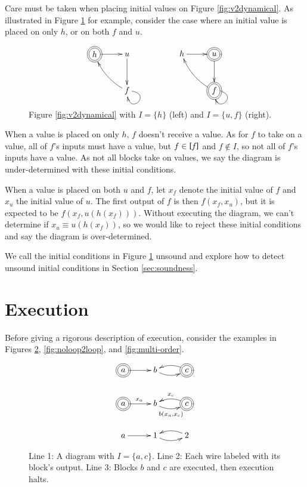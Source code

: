 \documentclass[twocolumn]{article}
\newcommand{\TightBracketB}[1]{\raisebox{0.25ex}{\scalebox{0.8}{\boldmath${#1\kern-0.65ex#1}$}}}%
\newcommand*{\Inputs}[1]{\TightBracketB[#1\TightBracketB]}
\begin{document}
Care must be taken when placing initial values on Figure \ref{fig:v2dynamical}. As illustrated in Figure \ref{fig:meow} for example, consider the case where an initial value is placed on only $h$, or on both $f$ and $u$.

\begin{figure}[h]
\[
    \xymatrix {
        *++[o][F=]{h} \ar[r] & u \ar[d] && h \ar[r] & *++[o][F=]{u} \ar[d] \\
        & f \ar@/^/[lu] \ar@(r, d)[] && & *++[o][F=]{f} \ar@/^/[lu] \ar@(r, d)[]
    }
\]
    \caption{Figure \ref{fig:v2dynamical} with $I=\{h\}$ (left) and $I=\{u, f\}$ (right).}
    \label{fig:meow}
\end{figure}

When a value is placed on only $h$, $f$ doesn't receive a value. As for $f$ to take on a value, all of $f$'s inputs must have a value, but $f\in\Inputs{f}$ and $f\not\in I$, so not all of $f$'s inputs have a value. As not all blocks take on values, we say the diagram is under-determined with these initial conditions.

When a value is placed on both $u$ and $f$, let $x_f$ denote the initial value of $f$ and $x_u$ the initial value of $u$. The first output of $f$ is then $f(x_f, x_u)$, but it is expected to be $f(x_f, u(h(x_f)))$. Without executing the diagram, we can't determine if $x_u\equiv u(h(x_f))$, so we would like to reject these initial conditions and say the diagram is over-determined.

We call the initial conditions in Figure \ref{fig:meow} unsound and explore how to detect unsound initial conditions in Section \ref{sec:soundness}.

\section{Execution}\label{sec:execution}

Before giving a rigorous description of execution, consider the examples in Figures \ref{fig:noloop}, \ref{fig:noloop2loop}, and \ref{fig:multi-order}.

\begin{figure}[h]
\[
\xymatrix{
    *++[o][F=]{a} \ar[r] & b \ar@/_/[r] & *++[o][F=]{c} \ar@/_/[l] \\
    *++[o][F=]{a} \ar[r]^{x_a} & b \ar@/_/[r]_{b(x_a, x_c)} & *++[o][F=]{c} \ar@/_/[l]_{x_c} \\
    a \ar[r] & 1 \ar@/_/[r] & 2 \ar@/_/[l] \\
}
\]
    \caption{Line 1: A diagram with $I=\{a, c\}$. Line 2: Each wire labeled with its block's output. Line 3: Blocks $b$ and $c$ are executed, then execution halts.}
    \label{fig:noloop}
\end{figure}
\end{document}
